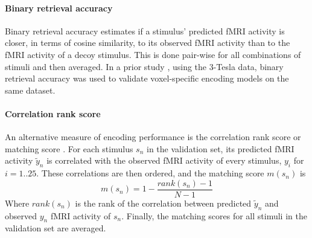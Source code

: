 \paragraph{Binary retrieval accuracy}

Binary retrieval accuracy \citep{ML08} estimates if a stimulus'
predicted f{MRI} activity is closer, in terms of cosine similarity, to its
observed f{MRI} activity than to the f{MRI} activity of a decoy stimulus.
This is done pair-wise for all combinations of stimuli and
then averaged.
In a prior study \citep{CTK+2012}, using the 3-Tesla data, binary retrieval
accuracy was used to validate voxel-specific encoding models on the same
dataset.

\paragraph{Correlation rank score}
%
An alternative measure of encoding performance is the correlation rank score or
matching score \citep{SF14}. For each stimulus $s_{n}$ in the validation set,
its predicted f{MRI} activity $\widetilde{y}_{n}$ is correlated with the
observed f{MRI} activity of every stimulus, $y_{i}$ for $i=1..25$. These
correlations are then ordered, and the  matching score $m(s_{n})$ is \[
m(s_{n}) = 1-\frac{rank(s_{n})-1}{N-1} \] Where $rank(s_{n})$ is the rank of
the correlation between predicted $\widetilde{y}_{n}$ and observed $y_{n}$
f{MRI} activity of $s_{n}$. Finally, the matching scores for all stimuli in the
validation set are averaged.



